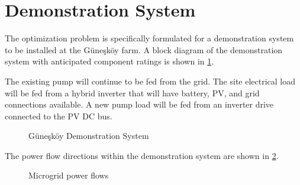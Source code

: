 \section{Demonstration System}
\label{sec:demo-system}

The optimization problem is specifically formulated for a demonstration system to be installed at the Güneşköy farm\cite{Guneskoy}. A block diagram of the demonstration system with anticipated component ratings is shown in \cref{fig:demo-system}.

The existing pump will continue to be fed from the grid. The site electrical load will be fed from a hybrid inverter\cite{INVT_manual} that will have battery, PV, and grid connections available. A new pump load will be fed from an inverter drive\cite{Growatt_manual} connected to the PV DC bus.

\begin{figure}[t]
	\centering
	\fontsize{6.7pt}{9pt}\selectfont
	\def\svgwidth{0.8\columnwidth}
	
	\caption{Güneşköy Demonstration System}
	\label{fig:demo-system}
\end{figure}

The power flow directions within the demonstration system are shown in \cref{fig:power-flows}.

\begin{figure}[t]
	\centering
	
	\caption{Microgrid power flows}
	\label{fig:power-flows}
\end{figure}





